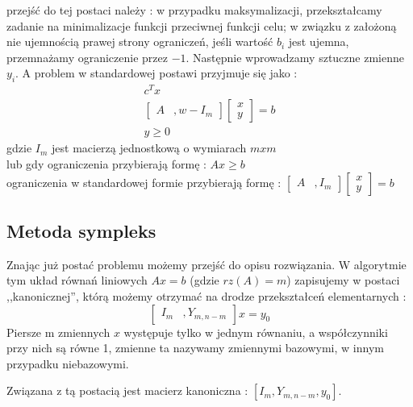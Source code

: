 \documentclass{classrep}
\begin{document}
 przejść do tej postaci należy : w przypadku maksymalizacji, przekształcamy zadanie na minimalizacje funkcji przeciwnej funkcji celu; w związku z założoną nie ujemnością prawej strony ograniczeń, jeśli wartość $b_i$ jest ujemna, przemnażamy ograniczenie przez $-1$. Następnie wprowadzamy sztuczne zmienne $y_i$. A problem w standardowej postawi przyjmuje się jako :
\begin{eqnarray}
c^{T}x\\
\left[ \begin{smallmatrix} A &,w -I_m \end{smallmatrix} \right] \left[ \begin{smallmatrix} x\\y \end{smallmatrix} \right] = b\\
y \geq 0
\end{eqnarray}
gdzie $I_m$ jest macierzą jednostkową o wymiarach $mxm$\\
lub gdy ograniczenia przybierają formę : $Ax \geq b$\\
ograniczenia w standardowej formie przybierają formę : 
$\left[ \begin{smallmatrix} A &, I_m \end{smallmatrix} \right] \left[ \begin{smallmatrix} x\\y \end{smallmatrix} \right] = b$\\


\subsection{Metoda sympleks}

Znając już postać problemu możemy przejść do opisu rozwiązania. 
W algorytmie tym układ równań liniowych $Ax=b$ (gdzie $rz(A)=m$) zapisujemy w postaci ,,kanonicznej'', którą możemy otrzymać na drodze przekształceń elementarnych :\\
$$\left[ \begin{smallmatrix} I_m &, Y_{m,n-m} \end{smallmatrix} \right] x = y_0 $$
Piersze m zmiennych $x$ występuje tylko w jednym równaniu, a współczynniki przy nich są równe 1, zmienne ta nazywamy zmiennymi bazowymi, w innym przypadku niebazowymi.


Związana z tą postacią jest macierz kanoniczna : $\left[  I_m , Y_{m,n-m}, y_0 \right] $.
\end{document}
